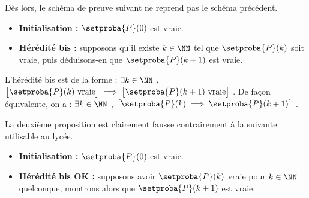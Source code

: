 \documentclass[12pt]{amsart}
\begin{document}
\bigskip

Dès lors, le schéma de preuve suivant ne reprend pas le schéma précédent.
	
	\begin{itemize}[label=\small\textbullet]
		\item \textbf{Initialisation :}
		      $\setproba{P}(0)$ est vraie.

		\item \textbf{Hérédité bis :}
		      supposons qu'il existe $k \in \NN$ tel que $\setproba{P}(k)$ soit vraie, puis déduisons-en que $\setproba{P}(k+1)$ est vraie.
	\end{itemize}

L'hérédité bis est de la forme :
$\exists k \in \NN$ , $\big[ \setproba{P}(k) \text{ vraie} \big] \implies \big[ \setproba{P}(k+1) \text{ vraie} \big]$ .
%
De façon équivalente, on a :
$\exists k \in \NN$ , $\big[ \setproba{P}(k) \implies \setproba{P}(k+1) \big]$ . 

\medskip

La deuxième proposition est clairement fausse contrairement à la suivante utilisable au lycée.
	
	\begin{itemize}[label=\small\textbullet]
		\item \textbf{Initialisation :}
		      $\setproba{P}(0)$ est vraie.

		\item \textbf{Hérédité bis OK :}
		      supposons avoir $\setproba{P}(k)$ vraie pour $k \in \NN$ quelconque, montrons alors que $\setproba{P}(k+1)$ est vraie.
	\end{itemize}
\end{document}
